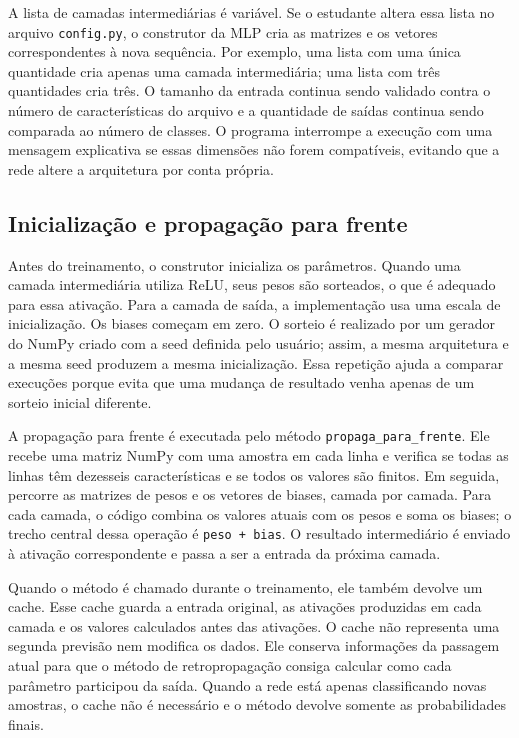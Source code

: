 \documentclass[12pt]{article}
\begin{document}
A lista de camadas intermediárias é variável. Se o estudante altera essa lista no arquivo \texttt{config.py}, o construtor da MLP cria as matrizes e os vetores correspondentes à nova sequência. Por exemplo, uma lista com uma única quantidade cria apenas uma camada intermediária; uma lista com três quantidades cria três. O tamanho da entrada continua sendo validado contra o número de características do arquivo e a quantidade de saídas continua sendo comparada ao número de classes. O programa interrompe a execução com uma mensagem explicativa se essas dimensões não forem compatíveis, evitando que a rede altere a arquitetura por conta própria.

\subsection{Inicialização e propagação para frente}

Antes do treinamento, o construtor inicializa os parâmetros. Quando uma camada intermediária utiliza ReLU, seus pesos são sorteados, o que é adequado para essa ativação. Para a camada de saída, a implementação usa uma escala de inicialização. Os biases começam em zero. O sorteio é realizado por um gerador do NumPy criado com a seed definida pelo usuário; assim, a mesma arquitetura e a mesma seed produzem a mesma inicialização. Essa repetição ajuda a comparar execuções porque evita que uma mudança de resultado venha apenas de um sorteio inicial diferente.

A propagação para frente é executada pelo método \texttt{propaga\_para\_frente}. Ele recebe uma matriz NumPy com uma amostra em cada linha e verifica se todas as linhas têm dezesseis características e se todos os valores são finitos. Em seguida, percorre as matrizes de pesos e os vetores de biases, camada por camada. Para cada camada, o código combina os valores atuais com os pesos e soma os biases; o trecho central dessa operação é \texttt{peso + bias}. O resultado intermediário é enviado à ativação correspondente e passa a ser a entrada da próxima camada.

Quando o método é chamado durante o treinamento, ele também devolve um cache. Esse cache guarda a entrada original, as ativações produzidas em cada camada e os valores calculados antes das ativações. O cache não representa uma segunda previsão nem modifica os dados. Ele conserva informações da passagem atual para que o método de retropropagação consiga calcular como cada parâmetro participou da saída. Quando a rede está apenas classificando novas amostras, o cache não é necessário e o método devolve somente as probabilidades finais.
\end{document}
